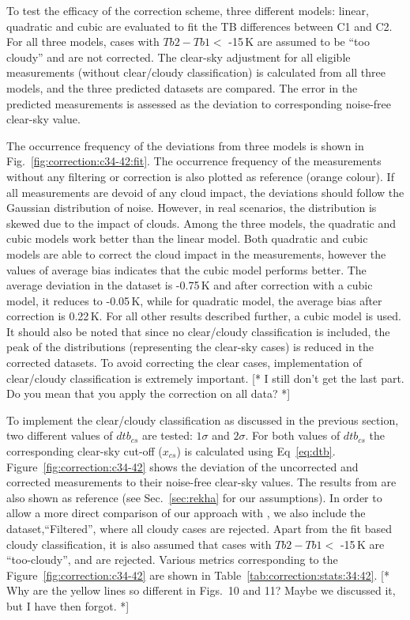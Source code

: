\documentclass[12pt]{article}
\begin{document}
To test the efficacy of the correction scheme, three different models: linear,
quadratic and cubic are evaluated to fit the TB differences between C1 and C2.
For all three models, cases with $Tb2-Tb1 < $ -15\,K are assumed to be ``too
cloudy'' and are not corrected. The clear-sky adjustment for all eligible
measurements (without clear/cloudy classification) is calculated from all three
models, and the three predicted datasets are compared. The error in the
predicted measurements is assessed as the deviation to corresponding noise-free
clear-sky value.

The occurrence frequency of the deviations from three models is shown in
Fig.~\ref{fig:correction:c34-42:fit}. The occurrence frequency of the
measurements without any filtering or correction is also plotted as reference
(orange colour). If all measurements are devoid of any cloud impact, the
deviations should follow the Gaussian distribution of noise. However, in real
scenarios, the distribution is skewed due to the impact of clouds. Among the
three models, the quadratic and cubic models work better than the linear model.
Both quadratic and cubic models are able to correct the cloud impact in the
measurements, however the values of average bias indicates that the cubic model
performs better. The average deviation in the dataset is -0.75\,K and after
correction with a cubic model, it reduces to -0.05\,K, while for quadratic
model, the average bias after correction is 0.22\,K. For all other results
described further, a cubic model is used. It should also be noted that since no
clear/cloudy classification is included, the peak of the distributions
(representing the clear-sky cases) is reduced in the corrected datasets. To
avoid correcting the clear cases, implementation of clear/cloudy classification
is extremely important. [* I still don't get the last part. Do you mean that you
apply the correction on all data? *]

To implement the clear/cloudy classification as discussed in the previous
section, two different values of $dtb_{cs}$ are tested: $1\sigma$ and
$2\sigma$. For both values of $dtb_{cs}$ the corresponding clear-sky cut-off
($x_{cs}$) is calculated using Eq~\ref{eq:dtb}.
Figure~\ref{fig:correction:c34-42} shows the deviation of the uncorrected and
corrected measurements to their noise-free clear-sky values. The results from
\cite{rekha2012potential} are also shown as reference (see Sec.~\ref{sec:rekha}
for our assumptions). In order to allow a more direct comparison of our
approach with \cite{rekha2012potential}, we also include the
dataset,``Filtered'', where all cloudy cases are rejected. Apart from the fit
based cloudy classification, it is also assumed that cases with $Tb2-Tb1 < $
-15\,K are ``too-cloudy'', and are rejected. Various metrics corresponding to
the Figure~\ref{fig:correction:c34-42} are shown in
Table~\ref{tab:correction:stats:34:42}. [* Why are the yellow lines so
different in Figs.~10 and 11? Maybe we discussed it, but I have then forgot. *]
\end{document}
